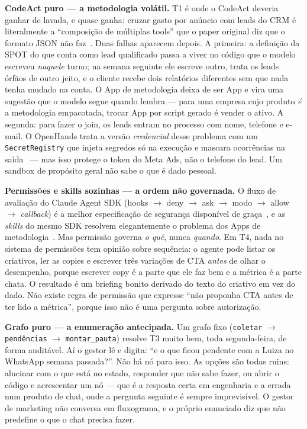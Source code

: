 \documentclass[10pt,twocolumn]{article}
\newcommand{\code}[1]{\texttt{\footnotesize #1}}
\begin{document}
\textbf{CodeAct puro --- a metodologia volátil.} T1 é onde o CodeAct deveria ganhar de
lavada, e quase ganha: cruzar gasto por anúncio com leads do CRM é literalmente a
``composição de múltiplas tools'' que o paper original diz que o formato JSON não
faz~\cite{wang2024codeact}. Duas falhas aparecem depois. A primeira: a definição da SPOT do
que conta como lead qualificado passa a viver no código que o modelo escreveu \emph{naquele}
turno; na semana seguinte ele escreve outro, trata os leads órfãos de outro jeito, e o
cliente recebe dois relatórios diferentes sem que nada tenha mudado na conta. O App de
metodologia deixa de ser App e vira uma sugestão que o modelo segue quando lembra --- para
uma empresa cujo produto \emph{é} a metodologia empacotada, trocar App por script gerado é
vender o ativo. A segunda: para fazer o join, os leads entram no processo com nome, telefone
e e-mail. O OpenHands trata a versão \emph{credencial} desse problema com um
\code{SecretRegistry} que injeta segredos só na execução e mascara ocorrências na
saída~\cite{wang2026openhands} --- mas isso protege o token do Meta Ads, não o telefone do
lead. Um sandbox de propósito geral não sabe o que é dado pessoal.

\textbf{Permissões e skills sozinhas --- a ordem não governada.} O fluxo de avaliação do
Claude Agent SDK (hooks $\rightarrow$ deny $\rightarrow$ ask $\rightarrow$ modo
$\rightarrow$ allow $\rightarrow$ \emph{callback}) é a melhor especificação de segurança
disponível de graça~\cite{anthropic2026permissions}, e as \emph{skills} do mesmo SDK
resolvem elegantemente o problema dos Apps de metodologia~\cite{anthropic2026agentsdk}. Mas permissão governa \emph{o quê}, nunca \emph{quando}.
Em T4, nada no sistema de permissões tem opinião sobre sequência: o agente pode listar os
criativos, ler as copies e escrever três variações de CTA \emph{antes} de olhar o
desempenho, porque escrever copy é a parte que ele faz bem e a métrica é a parte chata. O
resultado é um briefing bonito derivado do texto do criativo em vez do dado. Não existe
regra de permissão que expresse ``não proponha CTA antes de ter lido a métrica'', porque
isso não é uma pergunta sobre autorização.

\textbf{Grafo puro --- a enumeração antecipada.} Um grafo fixo
(\code{coletar} $\rightarrow$ \code{pendências} $\rightarrow$ \code{montar\_pauta}) resolve
T3 muito bem, toda segunda-feira, de forma auditável. Aí o gestor lê e digita: ``e o que
ficou pendente com a Luiza no WhatsApp semana passada?''. Não há nó para isso. As opções são
todas ruins: alucinar com o que está no estado, responder que não sabe fazer, ou abrir o
código e acrescentar um nó --- que é a resposta certa em engenharia e a errada num produto
de chat, onde a pergunta seguinte é sempre imprevisível. O gestor de marketing não conversa
em fluxograma, e o próprio enunciado diz que não predefine o que o chat precisa fazer.
\end{document}
